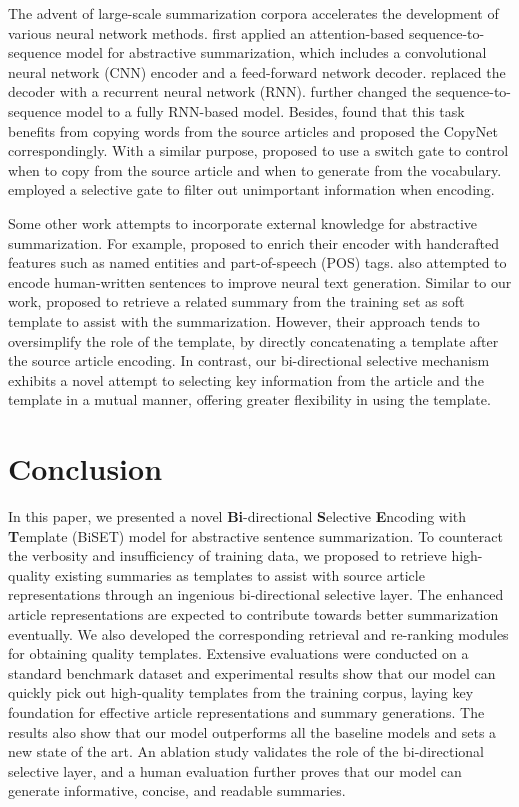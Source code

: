 \documentclass[11pt,a4paper]{article}
\begin{document}
\begin{spacing}{1.0}
The advent of large-scale summarization corpora accelerates the development of various neural network methods.  first applied an attention-based sequence-to-sequence model for abstractive summarization, which includes a convolutional neural network (CNN) encoder and a feed-forward network decoder.  replaced the decoder with a recurrent neural network (RNN).  further changed the sequence-to-sequence model to a fully RNN-based model. Besides,  found that this task benefits from copying words from the source articles and proposed the CopyNet correspondingly. With a similar purpose,  proposed to use a switch gate to control when to copy from the source article and when to generate from the vocabulary.  employed a selective gate to filter out unimportant information when encoding.

Some other work attempts to incorporate external knowledge for abstractive summarization. For example,  proposed to enrich their encoder with handcrafted features such as named entities and part-of-speech (POS) tags.  also attempted to encode human-written sentences to improve neural text generation. Similar to our work,  proposed to retrieve a related summary from the training set as soft template to assist with the summarization. However, their approach tends to oversimplify the role of the template, by directly concatenating a template after the source article encoding. In contrast, our bi-directional selective mechanism exhibits a novel attempt to selecting key information from the article and the template in a mutual manner, offering greater flexibility in using the template.


\section{Conclusion}
In this paper, we presented a novel \textbf{Bi}-directional \textbf{S}elective \textbf{E}ncoding with \textbf{T}emplate (BiSET) model for abstractive sentence summarization. To counteract the verbosity and insufficiency of training data, we proposed to retrieve high-quality existing summaries as templates to assist with source article representations through an ingenious bi-directional selective layer. The enhanced article representations are expected to contribute towards better summarization eventually. We also developed the corresponding retrieval and re-ranking modules for obtaining quality templates. Extensive evaluations were conducted on a standard benchmark dataset and experimental results show that our model can quickly pick out high-quality templates from the training corpus, laying key foundation for effective article representations and summary generations. The results also show that our model outperforms all the baseline models and sets a new state of the art. An ablation study validates the role of the bi-directional selective layer, and a human evaluation further proves that our model can generate informative, concise, and readable summaries.


\end{spacing}
\end{document}
